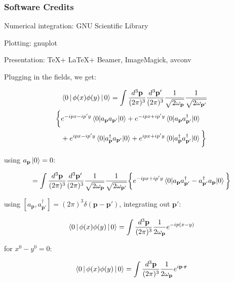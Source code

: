 \documentclass{beamer}
\newcommand{\vp}{\mathbf{p}}
\newcommand{\vr}{\mathbf{r}}
\newcommand{\vpp}{\mathbf{p}'}
\newcommand{\omvp}{\omega_{\vp}}
\newcommand{\omvpp}{\omega_{\vpp}}
\newcommand{\ap}{a_{\vp}}
\newcommand{\app}{a_{\vpp}}
\newcommand{\adp}{a^\dagger_{\vp}}
\newcommand{\adpp}{a^\dagger_{\vpp}}
\newcommand{\bysqrt}[1]{\frac{1}{\sqrt{#1}}}
\newcommand{\intpthree}{\int \frac{d^3\vp}{(2\pi)^3}}
\newcommand{\intpthreeppthree}{\int \frac{d^3\vp}{(2\pi)^3} \frac{d^3\vpp}{(2\pi)^3}}
\newcommand{\com}[2]{[{#1},{#2}]}
\newcommand{\phixy}{\Braket{0|\phi(x)\phi(y)|0}}
\begin{document}
\begin{frame}
\frametitle{Software Credits}

Numerical integration: GNU Scientific Library

Plotting: gnuplot

Presentation: \TeX + \LaTeX + Beamer, ImageMagick, avconv
\end{frame}





\begin{frame}
Plugging in the fields, we get:

\begin{equation*}
\begin{split}
& \phixy = \intpthreeppthree \bysqrt{2\omvp} \bysqrt{2\omvpp} \\
\bigg\{ & e^{-ipx-ip'y} \braket{0|\ap\app|0} + e^{-ipx+ip'y} \braket{0|\ap\adpp|0} \\
        & + e^{ipx-ip'y} \braket{0|\adp\app|0} + e^{ipx+ip'y} \braket{0|\adp\adpp|0} \bigg\}
\end{split}
\end{equation*}

using $\ap\ket{0} = 0$:

\begin{equation*}
= \intpthreeppthree \bysqrt{2\omvp} \bysqrt{2\omvpp}
\bigg\{ e^{-ipx+ip'y} \braket{0|\ap\adpp - \adpp\ap|0} \bigg\}
\end{equation*}
\end{frame}


\begin{frame}
using $\com{\ap}{\adpp} = (2\pi)^3 \delta(\vp - \vpp)$, integrating out $\vpp$:

\begin{equation*}
\phixy = \intpthree \frac{1}{2\omvp} e^{-ip(x-y)}
\end{equation*}

for $x^0 - y^0 = 0$:

\begin{equation*}
\phixy = \intpthree \frac{1}{2\omvp} e^{i\vp\cdot\vr}
\end{equation*}
\end{frame}
\end{document}
